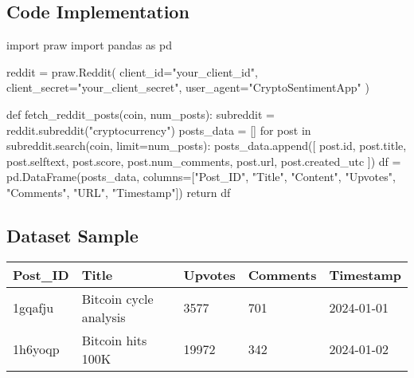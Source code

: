 \documentclass[
  letterpaper,
  DIV=11,
  numbers=noendperiod]{scrartcl}
\newenvironment{Shaded}{\begin{snugshade}}{\end{snugshade}}
\newcommand{\BuiltInTok}[1]{\textcolor[rgb]{0.00,0.23,0.31}{#1}}
\newcommand{\ControlFlowTok}[1]{\textcolor[rgb]{0.00,0.23,0.31}{#1}}
\newcommand{\ImportTok}[1]{\textcolor[rgb]{0.00,0.46,0.62}{#1}}
\newcommand{\KeywordTok}[1]{\textcolor[rgb]{0.00,0.23,0.31}{#1}}
\newcommand{\NormalTok}[1]{\textcolor[rgb]{0.00,0.23,0.31}{#1}}
\newcommand{\OperatorTok}[1]{\textcolor[rgb]{0.37,0.37,0.37}{#1}}
\newcommand{\StringTok}[1]{\textcolor[rgb]{0.13,0.47,0.30}{#1}}
\begin{document}
\subsection{\texorpdfstring{\textbf{Code
Implementation}}{Code Implementation}}\label{code-implementation}

\begin{Shaded}
\begin{Highlighting}[]
\ImportTok{import}\NormalTok{ praw}
\ImportTok{import}\NormalTok{ pandas }\ImportTok{as}\NormalTok{ pd}

\NormalTok{reddit }\OperatorTok{=}\NormalTok{ praw.Reddit(}
\NormalTok{    client\_id}\OperatorTok{=}\StringTok{"your\_client\_id"}\NormalTok{,}
\NormalTok{    client\_secret}\OperatorTok{=}\StringTok{"your\_client\_secret"}\NormalTok{,}
\NormalTok{    user\_agent}\OperatorTok{=}\StringTok{"CryptoSentimentApp"}
\NormalTok{)}

\KeywordTok{def}\NormalTok{ fetch\_reddit\_posts(coin, num\_posts):}
\NormalTok{    subreddit }\OperatorTok{=}\NormalTok{ reddit.subreddit(}\StringTok{"cryptocurrency"}\NormalTok{)}
\NormalTok{    posts\_data }\OperatorTok{=}\NormalTok{ []}
    \ControlFlowTok{for}\NormalTok{ post }\KeywordTok{in}\NormalTok{ subreddit.search(coin, limit}\OperatorTok{=}\NormalTok{num\_posts):}
\NormalTok{        posts\_data.append([}
\NormalTok{            post.}\BuiltInTok{id}\NormalTok{, post.title, post.selftext, post.score, post.num\_comments, post.url, post.created\_utc}
\NormalTok{        ])}
\NormalTok{    df }\OperatorTok{=}\NormalTok{ pd.DataFrame(posts\_data, columns}\OperatorTok{=}\NormalTok{[}\StringTok{"Post\_ID"}\NormalTok{, }\StringTok{"Title"}\NormalTok{, }\StringTok{"Content"}\NormalTok{, }\StringTok{"Upvotes"}\NormalTok{, }\StringTok{"Comments"}\NormalTok{, }\StringTok{"URL"}\NormalTok{, }\StringTok{"Timestamp"}\NormalTok{])}
    \ControlFlowTok{return}\NormalTok{ df}
\end{Highlighting}
\end{Shaded}

\subsection{\texorpdfstring{\textbf{Dataset
Sample}}{Dataset Sample}}\label{dataset-sample}

\begin{longtable}[]{@{}lllll@{}}
\toprule\noalign{}
Post\_ID & Title & Upvotes & Comments & Timestamp \\
\midrule\noalign{}
\endhead
\bottomrule\noalign{}
\endlastfoot
1gqafju & Bitcoin cycle analysis & 3577 & 701 & 2024-01-01 \\
1h6yoqp & Bitcoin hits 100K & 19972 & 342 & 2024-01-02 \\
\end{longtable}
\end{document}
